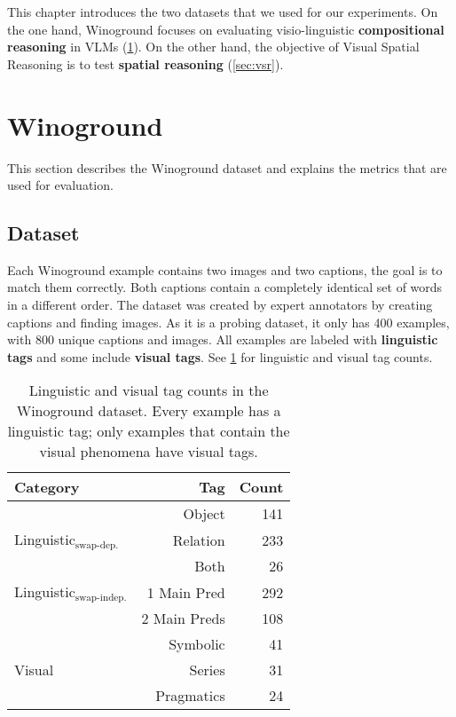 This chapter introduces the two datasets that we used for our experiments. On the one hand, Winoground \cite{thrush2022winoground} focuses on evaluating visio-linguistic \textbf{compositional reasoning} in VLMs (\ref{sec:winoground}). On the other hand, the objective of Visual Spatial Reasoning \cite{liu2022visual} is to test \textbf{spatial reasoning} (\ref{sec:vsr}).

\section{Winoground} \label{sec:winoground}

This section describes the Winoground \cite{thrush2022winoground} dataset and explains the metrics that are used for evaluation.

\subsection{Dataset}

Each Winoground example contains two images and two captions, the goal
is to match them correctly. Both captions contain a completely identical set of words in a different order. The dataset was created by expert annotators by creating captions and finding images. As it is a probing dataset, it only has 400 examples, with 800 unique captions and images. All examples are labeled with \textbf{linguistic tags} and some include \textbf{visual tags}. See \cref{tab:stats-tag-subset} for linguistic and visual tag counts.

\begin{table}[ht]
\centering
\begin{tabular}{lrr}
\toprule
 Category & Tag    &   Count \\
\midrule
 & Object   &     141 \\
 Linguistic$_\text{swap-dep.}$ & Relation &     233 \\
 & Both &      26 \\\midrule
 Linguistic$_\text{swap-indep.}$ & 1 Main Pred & 292 \\
 & 2 Main Preds & 108 \\\midrule
 & Symbolic &  41 \\
 Visual & Series &  31 \\
 & Pragmatics &  24\\
\bottomrule
\end{tabular}
\caption{Linguistic and visual tag counts in the Winoground dataset. Every example has a linguistic tag; only examples that contain the visual phenomena have visual tags.}
\label{tab:stats-tag-subset}
\end{table}

